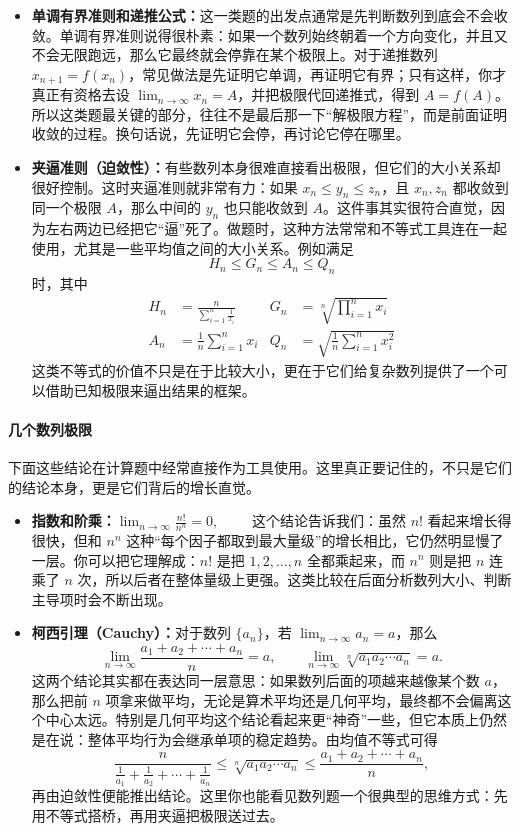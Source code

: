 \documentclass[UTF8]{ctexbook}
\begin{document}
\begin{itemize}
  \item \textbf{单调有界准则和递推公式：}这一类题的出发点通常是先判断数列到底会不会收敛。单调有界准则说得很朴素：如果一个数列始终朝着一个方向变化，并且又不会无限跑远，那么它最终就会停靠在某个极限上。对于递推数列 $x_{n+1}=f(x_n)$，常见做法是先证明它单调，再证明它有界；只有这样，你才真正有资格去设 $\lim_{n\to\infty}x_n=A$，并把极限代回递推式，得到 $A=f(A)$。所以这类题最关键的部分，往往不是最后那一下“解极限方程”，而是前面证明收敛的过程。换句话说，先证明它会停，再讨论它停在哪里。
  \item \textbf{夹逼准则（迫敛性）：}有些数列本身很难直接看出极限，但它们的大小关系却很好控制。这时夹逼准则就非常有力：如果 $x_n\le y_n\le z_n$，且 $x_n,z_n$ 都收敛到同一个极限 $A$，那么中间的 $y_n$ 也只能收敛到 $A$。这件事其实很符合直觉，因为左右两边已经把它“逼”死了。做题时，这种方法常常和不等式工具连在一起使用，尤其是一些平均值之间的大小关系。例如满足
  \[
  H_n\le G_n\le A_n\le Q_n
  \]
  时，其中
  \[
  \begin{aligned}
  H_n&=\frac{n}{\sum_{i=1}^n \frac{1}{x_i}}
  &G_n&=\sqrt[n]{\prod_{i=1}^n x_i}\\
  A_n&=\frac{1}{n}\sum_{i=1}^n x_i
  &Q_n&=\sqrt{\frac{1}{n}\sum_{i=1}^n x_i^2}
  \end{aligned}
  \]
  这类不等式的价值不只是在于比较大小，更在于它们给复杂数列提供了一个可以借助已知极限来逼出结果的框架。
\end{itemize}

\paragraph{几个数列极限}

下面这些结论在计算题中经常直接作为工具使用。这里真正要记住的，不只是它们的结论本身，更是它们背后的增长直觉。

\begin{itemize}
  \item \textbf{指数和阶乘：}$\lim_{n\to\infty}\frac{n!}{n^n}=0,\qquad$
  这个结论告诉我们：虽然 $n!$ 看起来增长得很快，但和 $n^n$ 这种“每个因子都取到最大量级”的增长相比，它仍然明显慢了一层。你可以把它理解成：$n!$ 是把 $1,2,\dots,n$ 全都乘起来，而 $n^n$ 则是把 $n$ 连乘了 $n$ 次，所以后者在整体量级上更强。这类比较在后面分析数列大小、判断主导项时会不断出现。
  \item \textbf{柯西引理（Cauchy）：}对于数列 $\{a_n\}$，若 $\lim_{n\to\infty}a_n=a$，那么
\[
\lim_{n\to\infty}\frac{a_1+a_2+\cdots+a_n}{n}=a,
\qquad
\lim_{n\to\infty}\sqrt[n]{a_1a_2\cdots a_n}=a.
\]
这两个结论其实都在表达同一层意思：如果数列后面的项越来越像某个数 $a$，那么把前 $n$ 项拿来做平均，无论是算术平均还是几何平均，最终都不会偏离这个中心太远。特别是几何平均这个结论看起来更“神奇”一些，但它本质上仍然是在说：整体平均行为会继承单项的稳定趋势。由均值不等式可得
\[
\frac{n}{\frac{1}{a_1}+\frac{1}{a_2}+\cdots+\frac{1}{a_n}}
\le
\sqrt[n]{a_1a_2\cdots a_n}
\le
\frac{a_1+a_2+\cdots+a_n}{n},
\]
再由迫敛性便能推出结论。这里你也能看见数列题一个很典型的思维方式：先用不等式搭桥，再用夹逼把极限送过去。
\end{itemize}
\end{document}
